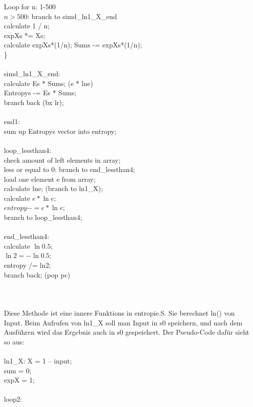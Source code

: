 \documentclass[11pt]{article}
\begin{document}
	Loop for n: 1-500{\\
		$n > 500$: branch to simd\_ln1\_X\_end\\
		calculate 1 / n;\\
		expXs *= Xs;\\
		calculate expXs*(1/n); 
		Sums -= expXs*(1/n);\\
\}\\\\
simd\_ln1\_X\_end:\\
	calculate Es * Sums; (e * lne)\\
	Entropys -= Es * Sums;\\
	branch back (bx lr);\\\\
end1:\\
	sum up Entropys vector into entropy;\\\\
loop\_lessthan4:\\
	check amount of left elements in array;\\
	less or equal to 0: branch to end\_lessthan4;\\
	load one element e from array;\\
	calculate lne; (branch to ln1\_X);\\
	calculate $e * \ln{e}$;\\
	$entropy -= e * \ln{e}$;\\
	branch to loop\_lessthan4;\\\\
end\_lessthan4:\\
	calculate $\ln{0.5}$;\\
	$\ln{2} = -\ln{0.5}$;\\
	entropy /= ln2;\\
	branch back; (pop {pc})\\\\
{\color{red}{\Large ln1\_X:}}\\\\
Diese Methode ist eine innere Funktions in entropie.S. Sie berechnet ln() von Input. Beim Aufrufen von ln1\_X soll man Input in s0 speichern, und nach dem Ausf\"uhren wird das Ergebnis auch in s0 gespeichert.
Der Pseudo-Code daf\"ur sieht so aus:\\\\
ln1\_X:
	X = 1 – input;\\
	sum = 0;\\
	expX = 1;\\\\
loop2:\\
}
\end{document}
